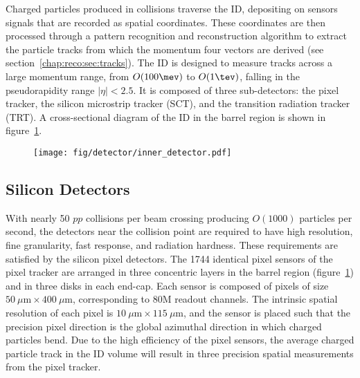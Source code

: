 
Charged particles produced in collisions traverse the ID,
depositing on sensors signals that are recorded as spatial coordinates. These
coordinates are then processed through a pattern recognition and
reconstruction algorithm to extract the particle tracks from which the
momentum four vectors are derived (see
section~\ref{chap:reco:sec:tracks}). The ID is designed to measure
tracks across a large momentum range, from $O(100 \mev)$ to $O(1
\tev)$, falling in the pseudorapidity range $|\eta| < 2.5$. It is composed of three
sub-detectors: the pixel tracker, the silicon microstrip tracker
(SCT), and the transition radiation tracker (TRT). A cross-sectional
diagram of the ID in the barrel region is shown in
figure~\ref{chap:detector:fig:inner_detector}.

\begin{figure}[ht]
    \centering
    \texttt{[image: fig/detector/inner\_detector.pdf]}
    \caption[]{}
\label{chap:detector:fig:inner_detector}
\end{figure}

\subsection{Silicon Detectors}

With nearly 50 $pp$ collisions per beam crossing producing $O(1000)$
particles per second, the detectors near the collision point are
required to have high resolution, fine granularity, fast response, and
radiation hardness. These requirements are satisfied by the silicon
pixel detectors. The 1744 identical pixel sensors of the pixel tracker
are arranged in three concentric layers in the barrel region
(figure~\ref{chap:detector:fig:inner_detector}) and in three disks in
each end-cap. Each sensor is composed of  pixels of
size $50~\mu\textrm{m} \times 400~\mu\textrm{m}$, corresponding to 80M readout
channels. The intrinsic spatial resolution of each pixel is
$10~\mu\textrm{m} \times 115~\mu\textrm{m}$, and the sensor is placed
such
that the precision pixel direction is the global azimuthal direction
in which charged particles bend. Due to the high efficiency of the
pixel sensors, the average charged particle
track in the ID volume will result in three precision spatial
measurements from the pixel tracker. 

